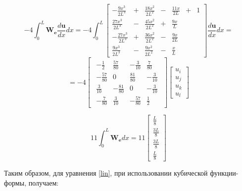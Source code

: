 $$
 -4   \int_0^L \mathbf{W_e} \frac{d \mathbf{u}}{dx} dx
=
 -4  \int_0^L
\begin{bmatrix}
  -\frac{9x^3}{2L^3}&+&\frac{18x^2}{2L^2}&-&\frac{11x}{2L} &+& 1\\
  \frac{27x^3}{2L^3}&-&\frac{45x^2}{2L^2}&+&\frac{9x}{L}&&\\
  -\frac{27x^3}{2L^3}&+&\frac{36x^2}{2L^2}&-&\frac{9x}{2L}&&\\
  \frac{9x^3}{2L^3}&-&\frac{9x^2}{2L^2}&-&\frac{x}{L}&&
\end{bmatrix}
\frac{d \mathbf{u}}{dx} dx
=
$$
$$
=
 -4  
\begin{bmatrix}
\begin{array}{rrrr}
	-\frac{1}{2} & \frac{57}{80} & -\frac{3}{10} & \frac{7}{80}\\
	-\frac{57}{80} & 0 & \frac{81}{80} & -\frac{3}{10} \\
	\frac{3}{10} & -\frac{81}{80} & 0 & -\frac{3}{10}\\
	-\frac{7}{80} & \frac{3}{10} & -\frac{57}{80} & \frac{1}{2}
\end{array}
\end{bmatrix}
\begin{bmatrix}
	u_i \\
	u_j \\
	u_k\\
	u_l
\end{bmatrix}
$$

$$
11 \int_0^L \mathbf{W_e} d x
=
11
\begin{bmatrix}
	\frac{L}{8} \\
	\frac{3L}{8}\\
	\frac{3L}{8}\\
	\frac{L}{8}
\end{bmatrix}
$$

\newpage
Таким образом, для уравнения \ref{lin}, при использовании кубической функции-формы,  получаем:

